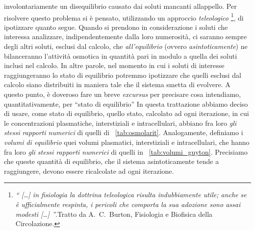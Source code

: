 involontariamente un disequilibrio causato dai soluti mancanti allappello. Per risolvere questo problema si è pensato, utilizzando un approccio \textit{teleologico}
\footnote{\textit{`` [\ldots] in fisiologia la dottrina teleologica risulta indubbiamente utile; anche se è ufficialmente respinta, i pericoli che comporta la sua adozione sono assai modesti [\ldots] ''}.Tratto da A.~C.~Burton, Fisiologia e Biofisica della Circolazione.}, di ipotizzare quanto segue. 
Quando si prendono in considerazione i soluti che interessa analizzare, indipendentemente dalla loro numerosità, ci saranno sempre degli altri soluti, esclusi dal calcolo, che \textit{all'equilibrio} (ovvero \textit{asintoticamente}) ne bilanceranno l'attività osmotica in quantità pari in modulo a quella dei soluti inclusi nel calcolo. In altre parole, nel momento in cui i soluti di interesse raggiungeranno lo stato di equilibrio potremmo ipotizzare che quelli esclusi dal calcolo siano distribuiti in maniera tale che il sistema smetta di evolvere.
\newline
\indent
A questo punto, è doveroso fare un breve \textit{excursus} per precisare cosa intendiamo, quantitativamente, per ``stato di equilibrio'' In questa trattazione abbiamo deciso di usare, come stato di equilibrio, quello stato, calcolato ad ogni iterazione, in cui le concentrazioni plasmatiche, interstiziali e intracellulari, abbiano fra loro \textit{gli stessi rapporti numerici} di quelli di \tablename~\ref{tab:osmolarit}. Analogamente, definiamo i \textit{volumi di equilibrio} quei volumi plasmatici, interstiziali e intracellulari, che hanno fra loro \textit{gli stessi rapporti numerici} di quelli in \tablename~\ref{tab:volumi_guyton}. Precisiamo che queste quantità di equilibrio, che il sistema asintoticamente tende a raggiungere, devono essere ricalcolate ad ogni iterazione.


